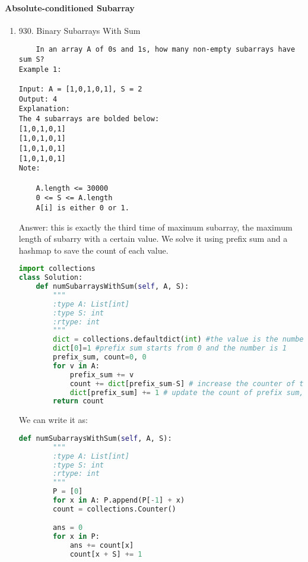 \documentclass[../main.tex]{subfiles}
\begin{document}
\paragraph{Absolute-conditioned Subarray}
\begin{enumerate}
    \item 930. Binary Subarrays With Sum
    \begin{lstlisting}
    In an array A of 0s and 1s, how many non-empty subarrays have sum S?
Example 1:

Input: A = [1,0,1,0,1], S = 2
Output: 4
Explanation: 
The 4 subarrays are bolded below:
[1,0,1,0,1]
[1,0,1,0,1]
[1,0,1,0,1]
[1,0,1,0,1]
Note:

    A.length <= 30000
    0 <= S <= A.length
    A[i] is either 0 or 1.
\end{lstlisting}
Answer: this is exactly the third time of maximum subarray, the maximum length of subarry with a certain value. We solve it using prefix sum and a hashmap to save the count of each value. 
\begin{lstlisting}[language=Python]
import collections
class Solution:
    def numSubarraysWithSum(self, A, S):
        """
        :type A: List[int]
        :type S: int
        :rtype: int
        """
        dict = collections.defaultdict(int) #the value is the number of the sum occurs
        dict[0]=1 #prefix sum starts from 0 and the number is 1
        prefix_sum, count=0, 0
        for v in A:
            prefix_sum += v
            count += dict[prefix_sum-S] # increase the counter of the appearing value k, default is 0
            dict[prefix_sum] += 1 # update the count of prefix sum, if it is first time, the default value is 0
        return count
\end{lstlisting}
We can write it as:
\begin{lstlisting}[language=Python]
    def numSubarraysWithSum(self, A, S):
        """
        :type A: List[int]
        :type S: int
        :rtype: int
        """
        P = [0]
        for x in A: P.append(P[-1] + x)
        count = collections.Counter()

        ans = 0
        for x in P:
            ans += count[x]
            count[x + S] += 1


\end{lstlisting}
\end{enumerate}
\end{document}
